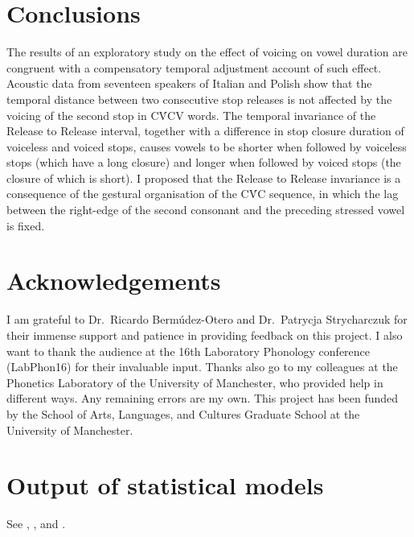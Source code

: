 \documentclass[12pt,]{article}
\begin{document}
\hypertarget{conclusions}{%
\section{Conclusions}\label{conclusions}}

The results of an exploratory study on the effect of voicing on vowel
duration are congruent with a compensatory temporal adjustment account
of such effect. Acoustic data from seventeen speakers of Italian and
Polish show that the temporal distance between two consecutive stop
releases is not affected by the voicing of the second stop in CV́CV
words. The temporal invariance of the Release to Release interval,
together with a difference in stop closure duration of voiceless and
voiced stops, causes vowels to be shorter when followed by voiceless
stops (which have a long closure) and longer when followed by voiced
stops (the closure of which is short). I proposed that the Release to
Release invariance is a consequence of the gestural organisation of the
CV́C sequence, in which the lag between the right-edge of the second
consonant and the preceding stressed vowel is fixed.

\hypertarget{acknowledgements}{%
\section{Acknowledgements}\label{acknowledgements}}

I am grateful to Dr.~Ricardo Bermúdez-Otero and Dr.~Patrycja
Strycharczuk for their immense support and patience in providing
feedback on this project. I also want to thank the audience at the 16th
Laboratory Phonology conference (LabPhon16) for their invaluable input.
Thanks also go to my colleagues at the Phonetics Laboratory of the
University of Manchester, who provided help in different ways. Any
remaining errors are my own. This project has been funded by the School
of Arts, Languages, and Cultures Graduate School at the University of
Manchester.

\appendix

\hypertarget{output-of-statistical-models}{%
\section{Output of statistical
models}\label{output-of-statistical-models}}

\label{a:stats}

See , , and
.
\end{document}
